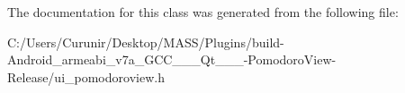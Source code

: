 The documentation for this class was generated from the following file\+:\begin{DoxyCompactItemize}
\item 
C\+:/\+Users/\+Curunir/\+Desktop/\+M\+A\+S\+S/\+Plugins/build-\/\+Android\+\_\+armeabi\+\_\+v7a\+\_\+\+G\+C\+C\+\_\+\_\+\_\+\+Qt\+\_\+\_\+\_-\/\+Pomodoro\+View-\/\+Release/ui\+\_\+pomodoroview.\+h\end{DoxyCompactItemize}
